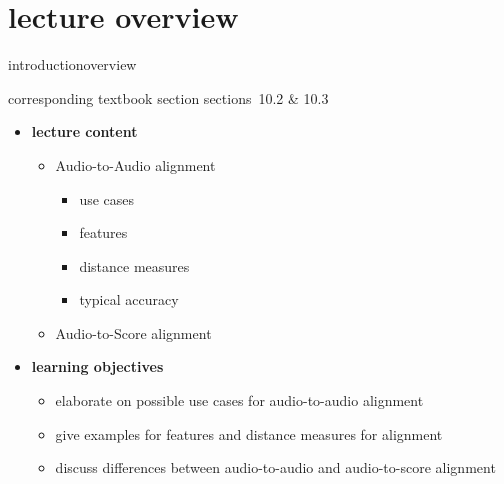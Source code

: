 


\subtitle{module 10.2: audio-to-audio \& audio-to-score alignment}


	

    \section[overview]{lecture overview}
        \begin{frame}{introduction}{overview}
            \begin{block}{corresponding textbook section}
                    sections~10.2 \& 10.3
            \end{block}

            \begin{itemize}
                \item   \textbf{lecture content}
                    \begin{itemize}
                        \item   Audio-to-Audio alignment
                            \begin{itemize}
                                \item   use cases
                                \item   features
                                \item   distance measures
                                \item   typical accuracy
                            \end{itemize}
                        \item   Audio-to-Score alignment
                    \end{itemize}
                \bigskip
                \item<2->   \textbf{learning objectives}
                    \begin{itemize}
                        \item   elaborate on possible use cases for audio-to-audio alignment
                        \item   give examples for features and distance measures for alignment
                        \item   discuss differences between audio-to-audio and audio-to-score alignment
                    \end{itemize}
            \end{itemize}
        \end{frame}

